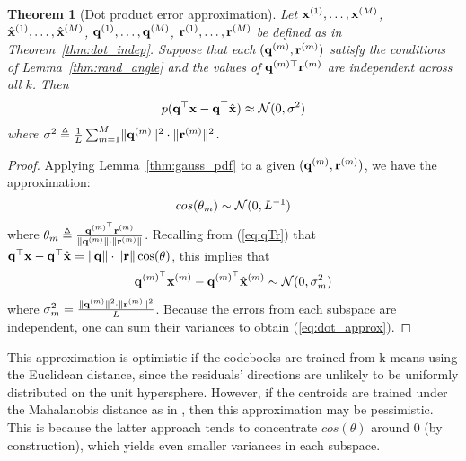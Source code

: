 \documentclass[]{article}
\newtheorem{theorem}{Theorem}[section]
\begin{document}

\begin{theorem}[Dot product error approximation] \label{thm:dot_approx}
Let $\mathbf{x}^{(1)},\ldots,\mathbf{x}^{(M)}$, \\ $\hat{\mathbf{x}}^{(1)},\ldots,\hat{\mathbf{x}}^{(M)}$, $\mathbf{q}^{(1)},\ldots,\mathbf{q}^{(M)}$, $\mathbf{r}^{(1)},\ldots,\mathbf{r}^{(M)}$ be defined as in Theorem~\ref{thm:dot_indep}. Suppose that each $(\mathbf{q}^{(m)}, \mathbf{r}^{(m)})$ satisfy the conditions of Lemma~\ref{thm:rand_angle} and the values of $\mathbf{q}^{(m)\top} \mathbf{r}^{(m)}$ are independent across all $k$. Then %
\begin{align} \label{eq:dot_approx}
    p(\mathbf{q}^\top \mathbf{x} - \mathbf{q}^\top \hat{\mathbf{x}}) \approx \operatorname{\mathcal{N}}(0, \sigma^2)
\end{align}
where $\sigma^2 \triangleq \frac{1}{L} \sum_{m=1}^M \lVert\mathbf{q}^{(m)} \rVert^2 \cdot \lVert\mathbf{r}^{(m)} \rVert^2$.
\end{theorem}

\begin{proof}
Applying Lemma~\ref{thm:gauss_pdf} to a given $(\mathbf{q}^{(m)}, \mathbf{r}^{(m)})$, we have the approximation:
\begin{align}
    cos(\theta_m) \sim \operatorname{\mathcal{N}}(0, L^{-1})
\end{align}
where $\theta_m \triangleq \frac{ \mathbf{q}^{(m)^\top}\mathbf{r}^{(m)} }{ \lVert\mathbf{q}^{(m)}\rVert \cdot \lVert\mathbf{r}^{(m)}\rVert }$. Recalling from (\ref{eq:qTr}) that $\mathbf{q}^\top \mathbf{x} - \mathbf{q}^\top \hat{\mathbf{x}} = \lVert\mathbf{q}\rVert \cdot \lVert\mathbf{r}\rVert \cos(\theta)$, this implies that
\begin{align}
    \mathbf{q}^{(m)^\top} \mathbf{x}^{(m)} - \mathbf{q}^{(m)^\top} \hat{\mathbf{x}}^{(m)} \sim \operatorname{\mathcal{N}}(0, \sigma_m^2)
\end{align}
where $\sigma_m^2 = \frac{ \lVert\mathbf{q}^{(m)}\rVert^2 \cdot \lVert\mathbf{r}^{(m)}\rVert^2 }{ L }$.
Because the errors from each subspace are independent, one can sum their variances to obtain (\ref{eq:dot_approx}). %
\end{proof}

This approximation is optimistic if the codebooks are trained from k-means using the Euclidean distance, since the residuals' directions are unlikely to be uniformly distributed on the unit hypersphere. However, if the centroids are trained under the Mahalanobis distance as in \cite{googleMips, pairQ}, then this approximation may be pessimistic. This is because the latter approach tends to concentrate $cos(\theta)$ around $0$ (by construction), which yields even smaller variances in each subspace.
\end{document}
